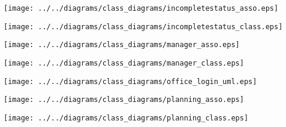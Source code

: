     \begin{frame}
    \begin{center}
    \texttt{[image: ../../diagrams/class\_diagrams/incompletestatus\_asso.eps]}
    \end{center}
    \end{frame}
    

    \begin{frame}
    \begin{center}
    \texttt{[image: ../../diagrams/class\_diagrams/incompletestatus\_class.eps]}
    \end{center}
    \end{frame}
    

    \begin{frame}
    \begin{center}
    \texttt{[image: ../../diagrams/class\_diagrams/manager\_asso.eps]}
    \end{center}
    \end{frame}
    

    \begin{frame}
    \begin{center}
    \texttt{[image: ../../diagrams/class\_diagrams/manager\_class.eps]}
    \end{center}
    \end{frame}
    

    \begin{frame}
    \begin{center}
    \texttt{[image: ../../diagrams/class\_diagrams/office\_login\_uml.eps]}
    \end{center}
    \end{frame}
    

    \begin{frame}
    \begin{center}
    \texttt{[image: ../../diagrams/class\_diagrams/planning\_asso.eps]}
    \end{center}
    \end{frame}
    

    \begin{frame}
    \begin{center}
    \texttt{[image: ../../diagrams/class\_diagrams/planning\_class.eps]}
    \end{center}
    \end{frame}
    

